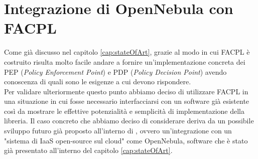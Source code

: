 
\chapter{Integrazione di OpenNebula con FACPL}
\label{cap:proposal}
Come già discusso nel capitolo \ref{cap:stateOfArt}, grazie al modo in cui FACPL\cite{facpl} è costruito risulta molto facile andare a fornire un'implementazione concreta dei PEP (\emph{Policy Enforcement Point}) e PDP (\emph{Policy Decision Point}) avendo conoscenza  di quali sono le esigenze a cui devono rispondere.\\
Per validare ulteriormente questo punto abbiamo deciso di utilizzare FACPL in una situazione in cui fosse necessario interfacciarsi con un software già esistente così da mostrare le effettive potenzialità e semplicità di implementazione della libreria.
Il caso concreto che abbiamo deciso di considerare deriva da un possibile sviluppo futuro già proposto all'interno di \cite{10.1007/978-3-319-08260-8_6}, ovvero un'integrazione con un "sistema di IaaS open-source sul cloud" come OpenNebula\cite{opennebula}, software che è stato già presentato all'interno del capitolo \ref{cap:stateOfArt}.

